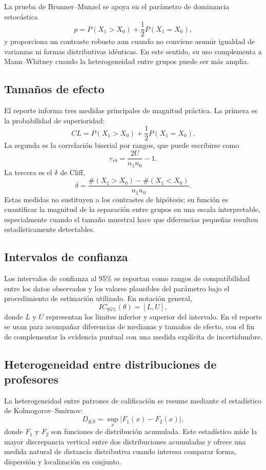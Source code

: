 \documentclass[10pt,letterpaper]{article} %
\numberwithin{figure}{subsection}
\begin{document}
La prueba de Brunner--Munzel se apoya en el parámetro de dominancia estocástica
\[
p=P(X_1>X_0)+\frac{1}{2}P(X_1=X_0),
\]
y proporciona un contraste robusto aun cuando no conviene asumir igualdad de varianzas ni formas distributivas idénticas. En este sentido, su uso complementa a Mann--Whitney cuando la heterogeneidad entre grupos puede ser más amplia.

\subsection{Tamaños de efecto}
El reporte informa tres medidas principales de magnitud práctica. La primera es la probabilidad de superioridad:
\[
CL=P(X_1>X_0)+\frac{1}{2}P(X_1=X_0).
\]
La segunda es la correlación biserial por rangos, que puede escribirse como
\[
r_{rb}=\frac{2U}{n_1n_0}-1.
\]
La tercera es el $\delta$ de Cliff,
\[
\delta=\frac{\#(X_1>X_0)-\#(X_1<X_0)}{n_1n_0}.
\]
Estas medidas no sustituyen a los contrastes de hipótesis; su función es cuantificar la magnitud de la separación entre grupos en una escala interpretable, especialmente cuando el tamaño muestral hace que diferencias pequeñas resulten estadísticamente detectables.

\subsection{Intervalos de confianza}
Los intervalos de confianza al 95\% se reportan como rangos de compatibilidad entre los datos observados y los valores plausibles del parámetro bajo el procedimiento de estimación utilizado. En notación general,
\[
IC_{95\%}(\theta)=[L,U],
\]
donde $L$ y $U$ representan los límites inferior y superior del intervalo. En el reporte se usan para acompañar diferencias de medianas y tamaños de efecto, con el fin de complementar la evidencia puntual con una medida explícita de incertidumbre.

\subsection{Heterogeneidad entre distribuciones de profesores}
La heterogeneidad entre patrones de calificación se resume mediante el estadístico de Kolmogorov--Smirnov:
\[
D_{KS}=\sup_x |F_1(x)-F_2(x)|,
\]
donde $F_1$ y $F_2$ son funciones de distribución acumulada. Este estadístico mide la mayor discrepancia vertical entre dos distribuciones acumuladas y ofrece una medida natural de distancia distributiva cuando interesa comparar forma, dispersión y localización en conjunto.
\end{document}
